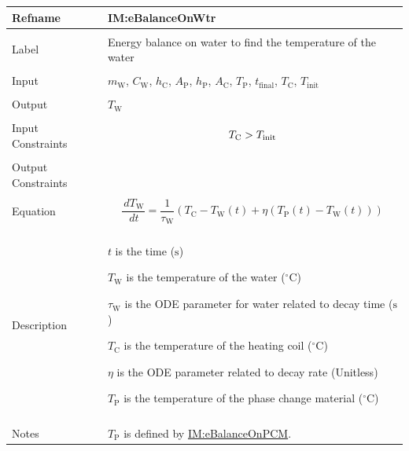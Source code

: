 \documentclass[12pt]{article}
\newcommand{\gt}{\ensuremath >}
\begin{document}
\vspace{\baselineskip}
\noindent
\begin{minipage}{\textwidth}
\begin{tabular}{>{\raggedright}p{}>{\raggedright\arraybackslash}p{}}
\toprule \textbf{Refname} & \textbf{IM:eBalanceOnWtr}
\label{IM:eBalanceOnWtr}
\\ \midrule \\
Label & Energy balance on water to find the temperature of the water
        
\\ \midrule \\
Input & ${m_{\text{W}}}$, ${C_{\text{W}}}$, ${h_{\text{C}}}$, ${A_{\text{P}}}$, ${h_{\text{P}}}$, ${A_{\text{C}}}$, ${T_{\text{P}}}$, ${t_{\text{final}}}$, ${T_{\text{C}}}$, ${T_{\text{init}}}$
        
\\ \midrule \\
Output & ${T_{\text{W}}}$
         
\\ \midrule \\
Input Constraints & \begin{displaymath}
                    {T_{\text{C}}}\gt{}{T_{\text{init}}}
                    \end{displaymath}
\\ \midrule \\
Output Constraints & 
\\ \midrule \\
Equation & \begin{displaymath}
           \frac{\,d{T_{\text{W}}}}{\,dt}=\frac{1}{{τ_{\text{W}}}} \left({T_{\text{C}}}-{T_{\text{W}}}\left(t\right)+η \left({T_{\text{P}}}\left(t\right)-{T_{\text{W}}}\left(t\right)\right)\right)
           \end{displaymath}
\\ \midrule \\
Description & \begin{symbDescription}
              \item{$t$ is the time (${\text{s}}$)}
              \item{${T_{\text{W}}}$ is the temperature of the water (${{}^{\circ}\text{C}}$)}
              \item{${τ_{\text{W}}}$ is the ODE parameter for water related to decay time (${\text{s}}$)}
              \item{${T_{\text{C}}}$ is the temperature of the heating coil (${{}^{\circ}\text{C}}$)}
              \item{$η$ is the ODE parameter related to decay rate (Unitless)}
              \item{${T_{\text{P}}}$ is the temperature of the phase change material (${{}^{\circ}\text{C}}$)}
              \end{symbDescription}
\\ \midrule \\
Notes & ${T_{\text{P}}}$ is defined by \hyperref[IM:eBalanceOnPCM]{IM:eBalanceOnPCM}.
        

\end{tabular}
\end{minipage}
\end{document}
